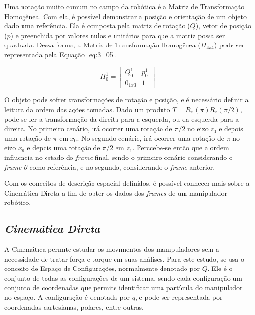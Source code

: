 Uma notação muito comum no campo da robótica é a Matriz de Transformação Homogênea. Com ela, é possível demonstrar a posição e orientação de um objeto dado uma referência. Ela é composta pela matriz de rotação ($Q$), vetor de posição ($p$) e preenchida por valores nulos e unitários para que a matriz possa ser quadrada. Dessa forma, a Matriz de Transformação Homogênea ($H_{4x4}$) pode ser representada pela Equação \ref{eq:3_05}.

\begin{equation}
H_0^1 = 
\begin{bmatrix}
Q_0^1 & p_0^1 \\
0_{1x3} & 1
\end{bmatrix} 
\label{eq:3_05}
\end{equation}

O objeto pode sofrer transformações de rotação e posição, e é necessário definir a leitura da ordem das ações tomadas. Dado um produto $T = R_x(\pi)R_z(\pi/2)$, pode-se ler a transformação da direita para a esquerda, ou da esquerda para a direita. No primeiro cenário, irá ocorrer uma rotação de $\pi/2$ no eizo $z_0$ e depois uma rotação de $\pi$ em $x_0$. No segundo cenário, irá ocorrer uma rotação de $\pi$ no eizo $x_0$ e depois uma rotação de $\pi/2$ em $z_1$. Perccebe-se então que a ordem influencia no estado do \textit{frame} final, sendo o primeiro cenário considerando o \textit{frame 0} como referência, e no segundo, considerando o \textit{frame} anterior.

Com os conceitos de descrição espacial definidos, é possível conhecer mais sobre a Cinemática Direta a fim de obter os dados dos \textit{frames} de um manipulador robótico.

\subsection{\textit{Cinemática Direta}}\label{sec:Cap3_CinDir}

A Cinemática permite estudar os movimentos dos manipuladores sem a necessidade de tratar força e torque em suas análises. Para este estudo, se usa o conceito de Espaço de Configurações, normalmente denotado por $Q$. Ele é o conjunto de todas as configurações de um sistema, sendo cada configuração um conjunto de coordenadas que permite identificar uma partícula do manipulador no espaço. A configuração é denotada por $q$, e pode ser representada por coordenadas cartesianas, polares, entre outras.

